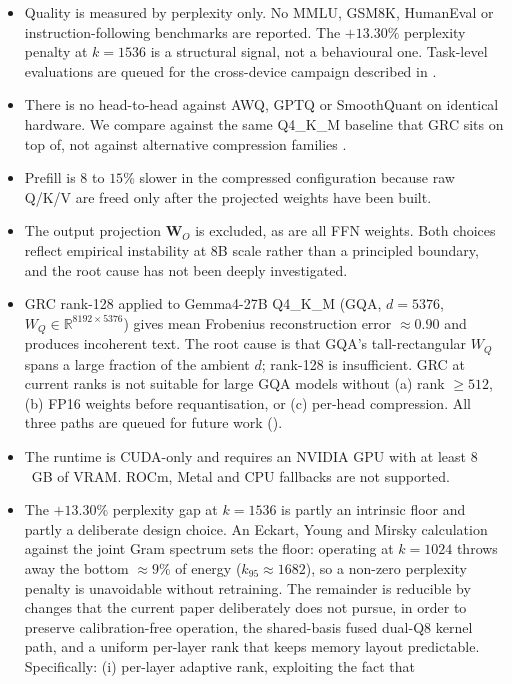 \documentclass[11pt]{article}
\providecommand{\Wmat}{\mathbf{W}}
\begin{document}
\begin{itemize}
\item Quality is measured by perplexity only. No MMLU, GSM8K, HumanEval
or instruction-following benchmarks are reported. The $+13.30\%$
perplexity penalty at $k{=}1536$ is a structural signal, not a
behavioural one. Task-level evaluations are queued for the cross-device
campaign described in .
\item There is no head-to-head against AWQ, GPTQ or SmoothQuant on
identical hardware. We compare against the same Q4\_K\_M baseline that
GRC sits on top of, not against alternative compression families
\cite{lin2023awq,frantar2022gptq,xiao2022smoothquant}.
\item Prefill is $8$ to $15\%$ slower in the compressed configuration
because raw Q/K/V are freed only after the projected weights have been
built.
\item The output projection $\Wmat_O$ is excluded, as are all FFN
weights. Both choices reflect empirical instability at 8B scale rather
than a principled boundary, and the root cause has not been deeply
investigated.
\item GRC rank-128 applied to Gemma4-27B Q4\_K\_M (GQA, $d{=}5376$,
$W_Q\!\in\!\mathbb{R}^{8192\times5376}$) gives mean Frobenius
reconstruction error ${\approx}0.90$ and produces incoherent text. The
root cause is that GQA's tall-rectangular $W_Q$ spans a large fraction
of the ambient $d$; rank-128 is insufficient. GRC at current ranks is
not suitable for large GQA models without (a) rank ${\geq}512$,
(b) FP16 weights before requantisation, or (c) per-head compression.
All three paths are queued for future work ().
\item The runtime is CUDA-only and requires an NVIDIA GPU with at least
$8$~GB of VRAM. ROCm, Metal and CPU fallbacks are not supported.
\item The $+13.30\%$ perplexity gap at $k{=}1536$ is partly an
intrinsic floor and partly a deliberate design choice. An Eckart, Young
and Mirsky calculation against the joint Gram spectrum sets the floor:
operating at $k{=}1024$ throws away the bottom ${\approx}9\%$ of energy
($k_{95}{\approx}1682$), so a non-zero perplexity penalty is unavoidable
without retraining. The remainder is reducible by changes that the
current paper deliberately does not pursue, in order to preserve
calibration-free operation, the shared-basis fused dual-Q8 kernel path,
and a uniform per-layer rank that keeps memory layout predictable.
Specifically: (i) per-layer adaptive rank, exploiting the fact that

\end{itemize}
\end{document}
